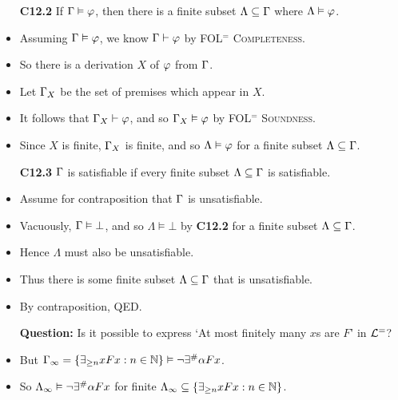 \documentclass[a4paper, 11pt]{article} %
\begin{document}
\begin{itemize}
  \item[\bf C12.2] If $\Gamma\vDash\varphi$, then there is a finite subset $\Lambda\subseteq\Gamma$ where $\Lambda\vDash\varphi$.
    \item Assuming $\Gamma\vDash\varphi$, we know $\Gamma\vdash\varphi$ by \textsc{FOL$^=$ Completeness}.
    \item So there is a derivation $X$ of $\varphi$ from $\Gamma$.
    \item Let $\Gamma_X$ be the set of premises which appear in $X$.
    \item It follows that $\Gamma_X\vdash\varphi$, and so $\Gamma_X\vDash\varphi$ by \textsc{FOL$^=$ Soundness}.
    \item Since $X$ is finite, $\Gamma_X$ is finite, and so $\Lambda\vDash\varphi$ for a finite subset $\Lambda\subseteq\Gamma$.
  \item[\bf C12.3] $\Gamma$ is satisfiable if every finite subset $\Lambda\subseteq\Gamma$ is satisfiable.
    \item Assume for contraposition that $\Gamma$ is unsatisfiable. 
    \item Vacuously, $\Gamma\vDash\bot$, and so $\Lambda\vDash\bot$ by \textbf{C12.2} for a finite subset $\Lambda\subseteq\Gamma$.
    \item Hence $\Lambda$ must also be unsatisfiable.
    \item Thus there is some finite subset $\Lambda\subseteq\Gamma$ that is unsatisfiable. 
    \item By contraposition, QED.
  \item[\bf Question:] Is it possible to express `At most finitely many $x$s are $F$' in $\mathcal{L}^=$? 
    \item But $\Gamma_\infty=\lbrace\exists_{\geq n}xFx:n\in\mathbb{N}\rbrace \vDash \neg \exists^\# \alpha Fx$.
    \item So $\Lambda_\infty \vDash \neg \exists^\# \alpha Fx$ for finite $\Lambda_\infty \subseteq \lbrace\exists_{\geq n}xFx:n\in\mathbb{N}\rbrace$.
\end{itemize}
\end{document}
